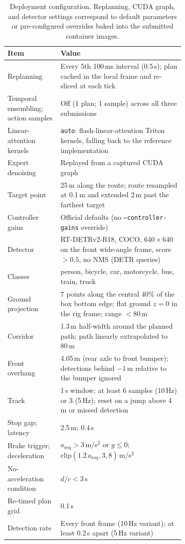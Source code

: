 \begin{table}[!htb]
\centering\scriptsize
\caption{Deployment configuration. Replanning, CUDA graph, and detector settings correspond to default parameters or pre-configured overrides baked into the submitted container images.}
\label{tab:app_deploy}
\begin{tabular}{@{}lp{0.70\linewidth}@{}}
\toprule
Item & Value \\
\midrule
Replanning & Every 5th 100\,ms interval (0.5\,s); plan cached in the local frame and re-sliced at each tick \\
Temporal ensembling; action samples & Off (1 plan; 1 sample) across all three submissions \\
Linear-attention kernels & \texttt{auto}: flash-linear-attention Triton kernels, falling back to the reference implementation \\
Expert denoising & Replayed from a captured CUDA graph \\
Target point & 25\,m along the route; route resampled at 0.1\,m and extended 2\,m past the farthest target \\
Controller gains & Official defaults (no \texttt{--controller-gains} override) \\
\midrule
Detector & RT-DETRv2-R18, COCO, $640\times640$ on the front wide-angle frame, score $>0.5$, no NMS (DETR queries) \\
Classes & person, bicycle, car, motorcycle, bus, train, truck \\
Ground projection & 7 points along the central 40\% of the box bottom edge; flat ground $z=0$ in the rig frame; range $<80$\,m \\
Corridor & 1.3\,m half-width around the planned path; path linearly extrapolated to 80\,m \\
Front overhang & 4.05\,m (rear axle to front bumper); detections behind $-1$\,m relative to the bumper ignored \\
Track & 1\,s window; at least 6 samples (10\,Hz) or 3 (5\,Hz); reset on a jump above 4\,m or missed detection \\
Stop gap; latency & 2.5\,m; 0.4\,s \\
Brake trigger; deceleration & $a_\mathrm{req}>3$\,m/s$^2$ or $g\le0$; $\mathrm{clip}(1.2\,a_\mathrm{req},3,8)$\,m/s$^2$ \\
No-acceleration condition & $d/c<3$\,s \\
Re-timed plan grid & 0.1\,s \\
Detection rate & Every front frame (10\,Hz variant); at least 0.2\,s apart (5\,Hz variant) \\
\bottomrule
\end{tabular}
\end{table}

